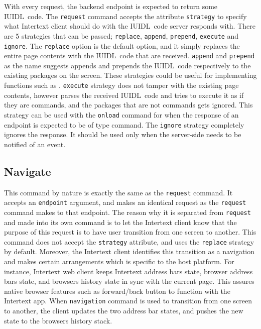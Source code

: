 With every request, the backend endpoint is expected to return some IUIDL~code. The \texttt{request} command accepts the attribute \texttt{strategy} to specify what Intertext client should do with the IUIDL~code server responds with. There are 5 strategies that can be passed; \texttt{replace}, \texttt{append}, \texttt{prepend}, \texttt{execute} and \texttt{ignore}. The \texttt{replace} option is the default option, and it simply replaces the entire page contents with the IUIDL~code that are received. \texttt{append} and \texttt{prepend} as the name suggests appends and prepends the IUIDL~code respectively to the existing packages on the screen. These strategies could be useful for implementing functions such as . \texttt{execute} strategy does not tamper with the existing page contents, however parses the received IUIDL~code and tries to execute it as if they are commands, and the packages that are not commands gets ignored. This strategy can be used with the \texttt{onload} command for when the response of an endpoint is expected to be of type command. The \texttt{ignore} strategy completely ignores the response. It should be used only when the server-side needs to be notified of an event.

\subsection{Navigate}

This command by nature is exactly the same as the \texttt{request} command. It accepts an \texttt{endpoint} argument, and makes an identical request as the \texttt{request} command makes to that endpoint. The reason why it is separated from \texttt{request} and made into its own command is to let the Intertext client know that the purpose of this request is to have user transition from one screen to another. This command does not accept the \texttt{strategy} attribute, and uses the \texttt{replace} strategy by default. Moreover, the Intertext client identifies this transition as a navigation and makes certain arrangements which is specific to the host platform. For instance, Intertext web client keeps Intertext address bars state, browser address bars state, and browsers history state in sync with the current page. This assures native browser features such as forward/back button to function with the Intertext app. When \texttt{navigation} command is used to transition from one screen to another, the client updates the two address bar states, and pushes the new state to the browsers history stack.
